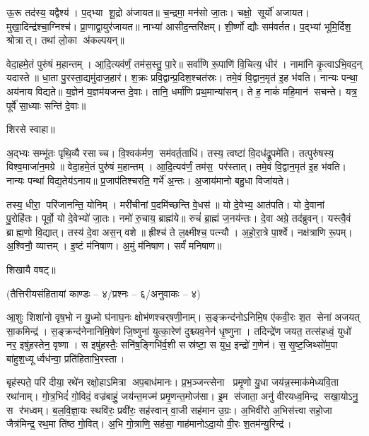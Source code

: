  ऊ॒रू तद॑स्य॒ यद्वैश्य॑। प॒द्भ्या शू॒द्रो अ॑जायत॥ च॒न्द्रमा॒ मन॑सो जा॒तः। चक्षो॒ सूर्यो॑ अजायत। मुखा॒दिन्द्र॑श्चा॒ग्निश्च॑। प्रा॒णाद्वा॒युर॑जायत॥ नाभ्या॑ आसीद॒न्तरि॑क्षम्। शी॒र्ष्णो द्यौः सम॑वर्तत। प॒द्भ्यां भूमि॒र्दिश॒ श्रोत्रात्। तथा॑ लो॒का अ॑कल्पयन्॥

 वेदा॒हमे॒तं पुरु॑षं म॒हान्तम्। आ॒दि॒त्यव॑र्णं॒ तम॑स॒स्तु॒ पा॒रे॥ सर्वा॑णि रू॒पाणि॑ वि॒चित्य॒ धीर॑। नामा॑नि कृ॒त्वाऽभि॒वद॒न् यदास्ते॥ धा॒ता पु॒रस्ता॒द्यमु॑दाज॒हार॑। श॒क्रः प्रवि॒द्वान्प्र॒दिश॒श्चत॑स्रः। तमे॒वं वि॒द्वान॒मृत॑ इ॒ह भ॑वति। नान्यः पन्था॒ अय॑नाय विद्यते॥ य॒ज्ञेन॑ य॒ज्ञम॑यजन्त दे॒वाः। तानि॒ धर्मा॑णि प्रथ॒मान्या॑सन्। ते ह॒ नाकं॑ महि॒मान॑ सचन्ते। यत्र॒ पूर्वे॑ सा॒ध्याः सन्ति॑ दे॒वाः॥ 

शिरसे स्वाहा॥

{\small \closesection}


अ॒द्भ्यः सम्भू॑तः पृथि॒व्यै रसाच्च। वि॒श्वक॑र्मण॒ सम॑वर्त॒ताधि॑। तस्य॒ त्वष्टा॑ वि॒दध॑द्रू॒पमे॑ति। तत्पुरु॑षस्य॒ विश्व॒माजा॑न॒मग्रे॥ वेदा॒हमे॒तं पुरु॑षं म॒हान्तम्। आ॒दि॒त्यव॑र्णं॒ तम॑स॒ पर॑स्तात्। तमे॒वं वि॒द्वान॒मृत॑ इ॒ह भ॑वति। नान्यः पन्था॑ विद्य॒तेय॑ऽनाय॥ प्र॒जाप॑तिश्चरति॒ गर्भे॑ अ॒न्तः। अ॒जाय॑मानो बहु॒धा विजा॑यते। 

तस्य॒ धीरा॒ परि॑जानन्ति॒ योनिम्। मरी॑चीनां प॒दमि॑च्छन्ति वे॒धस॑॥ यो दे॒वेभ्य॒ आत॑पति। यो दे॒वानां पु॒रोहि॑तः। पूर्वो॒ यो दे॒वेभ्यो॑ जा॒तः। नमो॑ रु॒चाय॒ ब्राह्म॑ये॥ रुचं॑ ब्रा॒ह्मं ज॒नय॑न्तः। दे॒वा अग्रे॒ तद॑ब्रुवन्। यस्त्वै॒वं ब्राह्म॒णो वि॒द्यात्। तस्य॑ दे॒वा अस॒न् वशे॥ ह्रीश्च॑ ते ल॒क्ष्मीश्च॒ पत्न्यौ। अ॒हो॒रा॒त्रे पा॒र्श्वे। नक्ष॑त्राणि रू॒पम्। अ॒श्विनौ॒ व्यात्तम्। इ॒ष्टं म॑निषाण। अ॒मुं म॑निषाण। सर्वं॑ मनिषाण॥ 

शिखायै वषट्॥

{\small \closesection}
\centerline{\normalsize (तैत्तिरीयसंहितायां काण्डः – ४/प्रश्नः – ६/अनुवाकः – ४)}

आ॒शुः शिशा॑नो वृष॒भो न यु॒ध्मो घ॑नाघ॒नः क्षोभ॑णश्चर्‌षणी॒नाम्। स॒ङ्क्रन्द॑नोऽनिमि॒ष ए॑कवी॒रः श॒त सेना॑ अजयत् सा॒कमिन्द्र॑। स॒ङ्क्रन्द॑नेनानिमि॒षेण॑ जि॒ष्णुना॑ युत्का॒रेण॑ दुश्च्यव॒नेन॑ धृ॒ष्णुना। तदिन्द्रे॑ण जयत॒ तत्स॑हध्वं॒ युधो॑ नर॒ इषु॑हस्तेन॒ वृष्णा। स इषु॑हस्तैः॒ सनि॑ष॒ङ्गिभि॑र्व॒शी सस्र॑ष्टा॒ स युध॒ इन्द्रो॑ ग॒णेन॑। स॒सृ॒ष्ट॒जिथ्सो॑म॒पा बा॑हुश॒ध्यूर्ध्वध॑न्वा॒ प्रति॑हिताभि॒रस्ता।

बृह॑स्पते॒ परि॑ दीया॒ रथे॑न रक्षो॒हाऽमित्रा अप॒बाध॑मानः। प्र॒भ॒ञ्जन्त्सेना प्रमृ॒णो यु॒धा जय॑न्न॒स्माक॑मेध्यवि॒ता रथा॑नाम्। गो॒त्र॒भिदं॑ गो॒विदं॒ वज्र॑बाहुं॒ जय॑न्त॒मज्म॑ प्रमृ॒णन्त॒मोज॑सा। इ॒म स॑जाता॒ अनु॑ वीरयध्व॒मिन्द्र सखा॒योऽनु॒ स र॑भध्वम्। ब॒ल॒वि॒ज्ञा॒यः स्थवि॑रः॒ प्रवी॑रः॒ सह॑स्वान् वा॒जी सह॑मान उ॒ग्रः। अ॒भिवी॑रो अ॒भिस॑त्त्वा सहो॒जा जैत्र॑मिन्द्र॒ रथ॒मा ति॑ष्ठ गो॒वित्। अ॒भि गो॒त्राणि॒ सह॑सा॒ गाह॑मानोऽदा॒यो वी॒रः श॒तम॑न्यु॒रिन्द्र॑।

